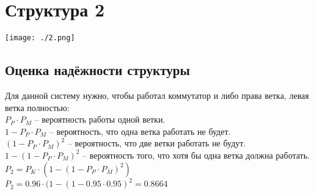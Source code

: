 \documentclass[12pt, a4paper] {ncc}
\begin{document}


\section{Структура 2}

	\texttt{[image: ./2.png]}
    \subsection{Оценка надёжности структуры}
		Для данной систему нужно, чтобы работал коммутатор и либо права ветка,
				  левая ветка полностью: \\
				  $P_P \cdot P_M$ -- вероятность работы одной ветки.\\
				  $1 - P_P \cdot P_M$ -- вероятность, что одна ветка работать не будет.\\
				  $(1 - P_P \cdot P_M)^2$ -- вероятность, что две ветки работать не будут.\\
				  $1 - (1 - P_P \cdot P_M)^2$ -- вероятность того, что хотя бы одна ветка должна работать.\\
				  $P_2 = P_K \cdot (1 - (1 - P_P \cdot P_M)^2)$ \\ 
				  $P_2 = 0.96 \cdot (1 - (1 - 0.95 \cdot 0.95) ^ 2 = 0.8664$
\end{document}
